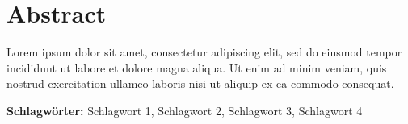 
{ \thispagestyle{empty} \MSonehalfspacing

\section*{Abstract}

Lorem ipsum dolor sit amet, consectetur adipiscing elit, sed do eiusmod tempor incididunt ut labore et dolore magna aliqua. Ut enim ad minim veniam, quis nostrud exercitation ullamco laboris nisi ut aliquip ex ea commodo consequat.

\vspace{1em} \noindent \textbf{Schlagwörter:} Schlagwort 1, Schlagwort 2, Schlagwort 3, Schlagwort 4

}

\clearpage